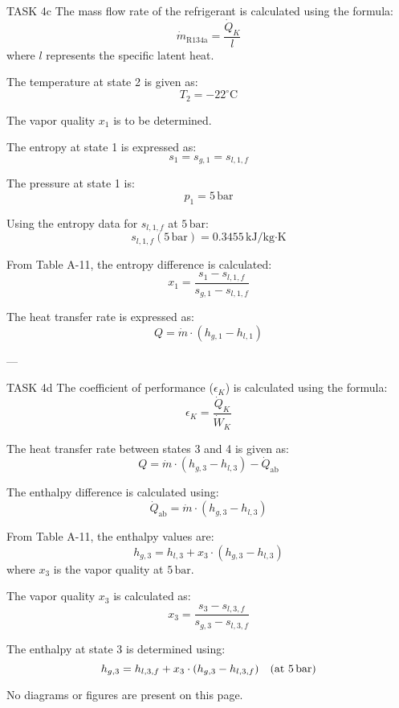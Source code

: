 TASK 4c  
The mass flow rate of the refrigerant is calculated using the formula:  
\[
\dot{m}_{\text{R134a}} = \frac{\dot{Q}_K}{l}
\]  
where \( l \) represents the specific latent heat.  

The temperature at state 2 is given as:  
\[
T_2 = -22^\circ\text{C}
\]  

The vapor quality \( x_1 \) is to be determined.  

The entropy at state 1 is expressed as:  
\[
s_1 = s_{g,1} = s_{l,1,f}
\]  

The pressure at state 1 is:  
\[
p_1 = 5 \, \text{bar}
\]  

Using the entropy data for \( s_{l,1,f} \) at \( 5 \, \text{bar} \):  
\[
s_{l,1,f}(5 \, \text{bar}) = 0.3455 \, \text{kJ/kg·K}
\]  

From Table A-11, the entropy difference is calculated:  
\[
x_1 = \frac{s_1 - s_{l,1,f}}{s_{g,1} - s_{l,1,f}}
\]  

The heat transfer rate is expressed as:  
\[
Q = \dot{m} \cdot (h_{g,1} - h_{l,1})
\]  

---

TASK 4d  
The coefficient of performance (\( \epsilon_K \)) is calculated using the formula:  
\[
\epsilon_K = \frac{\dot{Q}_K}{\dot{W}_K}
\]  

The heat transfer rate between states 3 and 4 is given as:  
\[
Q = \dot{m} \cdot (h_{g,3} - h_{l,3}) - \dot{Q}_{\text{ab}}
\]  

The enthalpy difference is calculated using:  
\[
\dot{Q}_{\text{ab}} = \dot{m} \cdot (h_{g,3} - h_{l,3})
\]  

From Table A-11, the enthalpy values are:  
\[
h_{g,3} = h_{l,3} + x_3 \cdot (h_{g,3} - h_{l,3})
\]  
where \( x_3 \) is the vapor quality at \( 5 \, \text{bar} \).  

The vapor quality \( x_3 \) is calculated as:  
\[
x_3 = \frac{s_3 - s_{l,3,f}}{s_{g,3} - s_{l,3,f}}
\]  

The enthalpy at state 3 is determined using:  
\[
h_{g,3} = h_{l,3,f} + x_3 \cdot (h_{g,3} - h_{l,3,f}) \quad \text{(at \( 5 \, \text{bar} \))}
\]  

No diagrams or figures are present on this page.